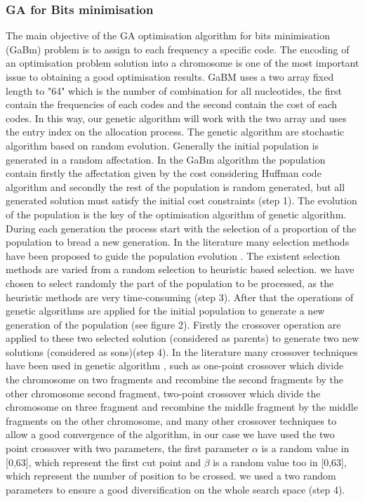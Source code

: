 \documentclass[preprint,12pt]{elsarticle}
\begin{document}
\subsubsection{GA for Bits minimisation}
The main objective of the GA optimisation algorithm for bits minimisation (GaBm) problem is to assign to each frequency a specific code. The encoding of an optimisation problem solution into a chromosome is one of the most important issue to obtaining a good optimisation results. GaBM uses a two array fixed length to "64" which is the number of combination for all nucleotides, the first contain the frequencies of each codes and the second contain the cost of each codes. In this way, our genetic algorithm will work with the two array and uses the entry index on the allocation process.
The genetic algorithm are stochastic algorithm based on random evolution. Generally the initial population is generated in a random affectation. In the GaBm algorithm the population contain firstly the affectation given by the cost considering Huffman code algorithm and secondly the rest of the population is random generated, but all generated solution must satisfy the initial cost constraints (step 1). 
The evolution of the population is the key of the optimisation algorithm of genetic algorithm. During each generation the process start with the selection of a proportion of the population to bread a new generation. In the literature many selection methods have been proposed to guide the population evolution \cite{bli95}. The existent selection methods are varied from a random selection to heuristic based selection. we have chosen to select randomly the part of the population to be processed, as the heuristic methods are very time-consuming (step 3).
After that the operations of genetic algorithms are applied for the initial population to generate a new generation of the population (see figure 2). Firstly the crossover operation are applied to these two selected solution (considered as parents) to generate two new solutions (considered as sons)(step 4). In the literature many crossover techniques have been used in genetic algorithm \cite{osa14}, such as one-point crossover which divide the chromosome on two fragments and recombine the second fragments by the other chromosome second fragment, two-point crossover which divide the chromosome on three fragment and recombine the middle fragment by  the middle fragments on the other chromosome, and many other crossover techniques to allow a good convergence of the algorithm, in our case we have used the two point crossover with two parameters, the first parameter $\alpha$ is a random value in [0,63], which represent the first cut point and $\beta$ is a random value too in [0,63], which represent the number of position to be crossed. we used a two random parameters to ensure a good diversification on the whole search space (step 4).
\end{document}
